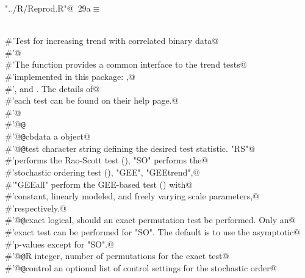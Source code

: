 \documentclass[reqno]{amsart}
\renewcommand{\NWtarget}[2]{\hypertarget{#1}{#2}}
\begin{document}
\begin{flushleft} \small\label{scrap40}\raggedright\small
\NWtarget{nuweb29a}{} \verb@"../R/Reprod.R"@\nobreak\ {\footnotesize {29a}}$\equiv$
\vspace{-1ex}
\begin{list}{}{} \item
\mbox{}\verb@@\\
\mbox{}\verb@#'Test for increasing trend with correlated binary data@\\
\mbox{}\verb@#'@\\
\mbox{}\verb@#'The  function provides a common interface to the trend tests@\\
\mbox{}\verb@#'implemented in this package: ,@\\
\mbox{}\verb@#', and . The details of@\\
\mbox{}\verb@#'each test can be found on their help page.@\\
\mbox{}\verb@#'@\\
\mbox{}\verb@#'@{\tt @}\verb@export@\\
\mbox{}\verb@#'@{\tt @}\verb@param cbdata a  object@\\
\mbox{}\verb@#'@{\tt @}\verb@param test character string defining the desired test statistic. "RS"@\\
\mbox{}\verb@#'performs the Rao-Scott test (), "SO" performs the@\\
\mbox{}\verb@#'stochastic ordering test (), "GEE", "GEEtrend",@\\
\mbox{}\verb@#'"GEEall" perform the GEE-based test () with@\\
\mbox{}\verb@#'constant, linearly modeled, and freely varying scale parameters,@\\
\mbox{}\verb@#'respectively.@\\
\mbox{}\verb@#'@{\tt @}\verb@param exact logical, should an exact permutation test be performed. Only an@\\
\mbox{}\verb@#'exact test can be performed for "SO". The default is to use the asymptotic@\\
\mbox{}\verb@#'p-values except for "SO".@\\
\mbox{}\verb@#'@{\tt @}\verb@param R integer, number of permutations for the exact test@\\
\mbox{}\verb@#'@{\tt @}\verb@param control an optional list of control settings for the stochastic order@\\

\end{list}
\end{flushleft}
\end{document}
